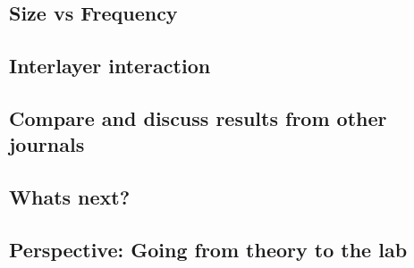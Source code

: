 \subsection{Size vs Frequency}


\subsection{Interlayer interaction}

\subsection{Compare and discuss results from other journals}

\subsection{Whats next?}

\subsection{Perspective: Going from theory to the lab}

